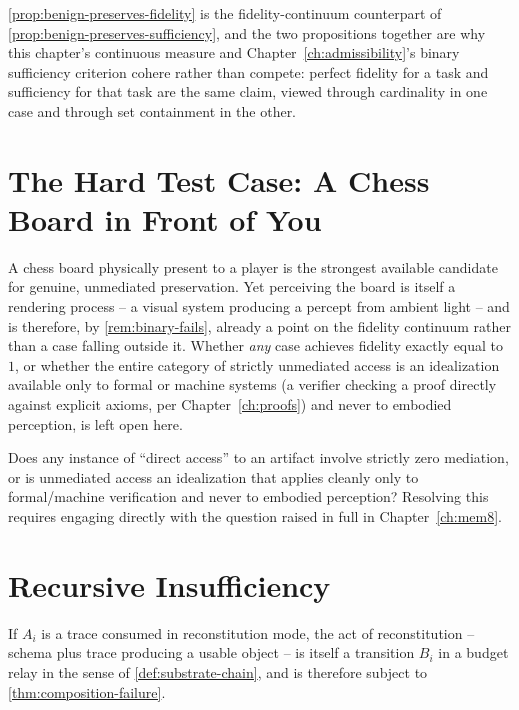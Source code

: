 \cref{prop:benign-preserves-fidelity} is the fidelity-continuum
counterpart of \cref{prop:benign-preserves-sufficiency}, and the two
propositions together are why this chapter's continuous measure and
Chapter~\ref{ch:admissibility}'s binary sufficiency criterion cohere
rather than compete: perfect fidelity for a task and sufficiency for that
task are the same claim, viewed through cardinality in one case and
through set containment in the other.

\section{The Hard Test Case: A Chess Board in Front of You}

A chess board physically present to a player is the strongest available
candidate for genuine, unmediated preservation. Yet perceiving the board
is itself a rendering process -- a visual system producing a percept from
ambient light -- and is therefore, by \cref{rem:binary-fails}, already a
point on the fidelity continuum rather than a case falling outside it.
Whether \emph{any} case achieves fidelity exactly equal to $1$, or
whether the entire category of strictly unmediated access is an
idealization available only to formal or machine systems (a verifier
checking a proof directly against explicit axioms, per
Chapter~\ref{ch:proofs}) and never to embodied perception, is left open
here.

\begin{openquestion}
\label{oq:unmediated-access}
Does any instance of ``direct access'' to an artifact involve strictly
zero mediation, or is unmediated access an idealization that applies
cleanly only to formal/machine verification and never to embodied
perception? Resolving this requires engaging directly with the question
raised in full in Chapter~\ref{ch:mem8}.
\end{openquestion}

\section{Recursive Insufficiency}

\begin{proposition}
\label{prop:recursive-insufficiency}
If $A_i$ is a trace consumed in reconstitution mode, the act of
reconstitution -- schema plus trace producing a usable object -- is
itself a transition $B_i$ in a budget relay in the sense of
\cref{def:substrate-chain}, and is therefore subject to
\cref{thm:composition-failure}.
\end{proposition}

